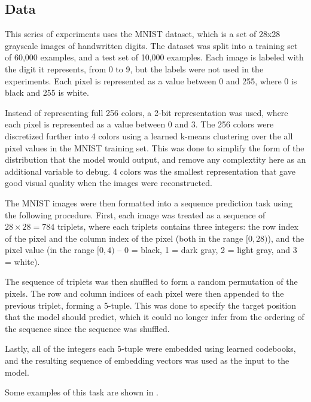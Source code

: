 \subsection{Data}

This series of experiments uses the MNIST dataset, which is a set of 28x28 grayscale images of handwritten digits. The dataset was split into a training set of 60,000 examples, and a test set of 10,000 examples. Each image is labeled with the digit it represents, from 0 to 9, but the labels were not used in the experiments. Each pixel is represented as a value between 0 and 255, where 0 is black and 255 is white.

Instead of representing full 256 colors, a 2-bit representation was used, where each pixel is represented as a value between 0 and 3. The 256 colors were discretized further into 4 colors using a learned k-means clustering over the all pixel values in the MNIST training set. This was done to simplify the form of the distribution that the model would output, and remove any complextity here as an additional variable to debug. 4 colors was the smallest representation that gave good visual quality when the images were reconstructed.

The MNIST images were then formatted into a sequence prediction task using the following procedure. First, each image was treated as a sequence of $28\times28 = 784$ triplets, where each triplets contains three integers: the row index of the pixel and the column index of the pixel (both in the range $[0, 28)$), and the pixel value (in the range $[0, 4)$ -- 0 = black, 1 = dark gray, 2 = light gray, and 3 = white).

The sequence of triplets was then shuffled to form a random permutation of the pixels. The row and column indices of each pixel were then appended to the previous triplet, forming a 5-tuple. This was done to specify the target position that the model should predict, which it could no longer infer from the ordering of the sequence since the sequence was shuffled.

Lastly, all of the integers each 5-tuple were embedded using learned codebooks, and the resulting sequence of embedding vectors was used as the input to the model.

Some examples of this task are shown in .

